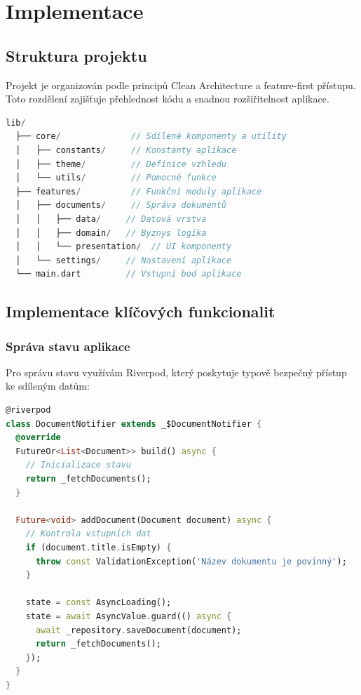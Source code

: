 \documentclass[12pt, a4paper,
twoside,        %
openright
]{report}
\begin{document}
\chapter{Implementace}
\label{chap:implementace}

\section{Struktura projektu}
Projekt je organizován podle principů Clean Architecture a feature-first přístupu. Toto rozdělení zajišťuje přehlednost kódu a snadnou rozšiřitelnost aplikace.

\begin{lstlisting}[language=Dart, caption={Základní struktura projektu}, label={lst:struktura}]
lib/
  ├── core/              // Sdílené komponenty a utility
  │   ├── constants/     // Konstanty aplikace
  │   ├── theme/         // Definice vzhledu
  │   └── utils/         // Pomocné funkce
  ├── features/          // Funkční moduly aplikace
  │   ├── documents/     // Správa dokumentů
  │   │   ├── data/     // Datová vrstva
  │   │   ├── domain/   // Byznys logika
  │   │   └── presentation/  // UI komponenty
  │   └── settings/     // Nastavení aplikace
  └── main.dart         // Vstupní bod aplikace
\end{lstlisting}

\section{Implementace klíčových funkcionalit}

\subsection{Správa stavu aplikace}
Pro správu stavu využívám Riverpod, který poskytuje typově bezpečný přístup ke sdíleným datům:

\begin{lstlisting}[language=Dart, caption={Implementace state managementu}, label={lst:state}]
@riverpod
class DocumentNotifier extends _$DocumentNotifier {
  @override
  FutureOr<List<Document>> build() async {
    // Inicializace stavu
    return _fetchDocuments();
  }

  Future<void> addDocument(Document document) async {
    // Kontrola vstupních dat
    if (document.title.isEmpty) {
      throw const ValidationException('Název dokumentu je povinný');
    }

    state = const AsyncLoading();
    state = await AsyncValue.guard(() async {
      await _repository.saveDocument(document);
      return _fetchDocuments();
    });
  }
}
\end{lstlisting}
\end{document}
